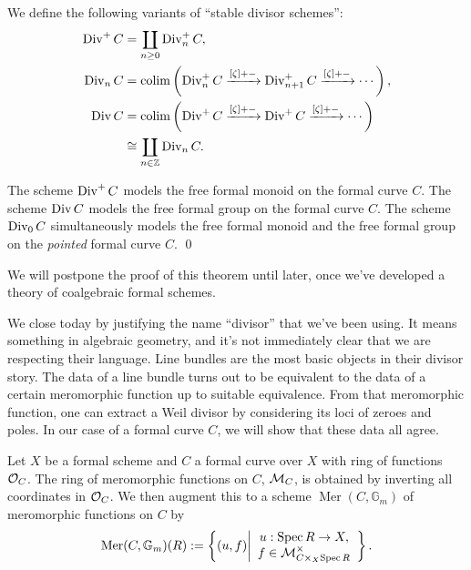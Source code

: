 \begin{definition}\label{StableDivisorSchemeDefn}
We define the following variants of ``stable divisor schemes'':
\begin{align*}
\operatorname{Div}^+ C & = \coprod_{n \ge 0} \operatorname{Div}_n^+ C, \\
\operatorname{Div}_n C & = \operatorname{colim} \left( \operatorname{Div}_n^+ C \xrightarrow{[\zeta] + -} \operatorname{Div}_{n+1}^+ C \xrightarrow{[\zeta] + -} \cdots \right), \\
\operatorname{Div} C & = \operatorname{colim} \left( \operatorname{Div}^+ C \xrightarrow{[\zeta] + -} \operatorname{Div}^+ C \xrightarrow{[\zeta] + -} \cdots \right) \\
& \cong \coprod_{n \in \mathbb Z} \operatorname{Div}_n C.
\end{align*}
\end{definition}

\begin{theorem}
The scheme $\operatorname{Div}^+ C$ models the free formal monoid on the formal curve $C$.  The scheme $\operatorname{Div} C$ models the free formal group on the formal curve $C$.  The scheme $\operatorname{Div}_0 C$ simultaneously models the free formal monoid and the free formal group on the \emph{pointed} formal curve $C$. \qed {}
\end{theorem}
\noindent We will postpone the proof of this theorem until later, once we've developed a theory of coalgebraic formal schemes.

We close today by justifying the name ``divisor'' that we've been using.  It means something in algebraic geometry, and it's not immediately clear that we are respecting their language.  Line bundles are the most basic objects in their divisor story.  The data of a line bundle turns out to be equivalent to the data of a certain meromorphic function up to suitable equivalence.  From that meromorphic function, one can extract a Weil divisor by considering its loci of zeroes and poles.  In our case of a formal curve $C$, we will show that these data all agree.

\begin{definition}
Let $X$ be a formal scheme and $C$ a formal curve over $X$ with ring of functions $\mathcal{O}_C$.  The ring of meromorphic functions on $C$, $\mathcal{M}_C$, is obtained by inverting all coordinates in $\mathcal{O}_C$.  We then augment this to a scheme $\operatorname{Mer}(C, \mathbb G_m)$ of meromorphic functions on $C$ by \[\operatorname{Mer}(C, \mathbb G_m)(R) := \left\{ (u, f) \middle| \begin{array}{c} u: \operatorname{Spec} R \to X, \\ f \in \mathcal{M}^\times_{C \times_X \operatorname{Spec} R} \end{array} \right\}.\]
\end{definition}

